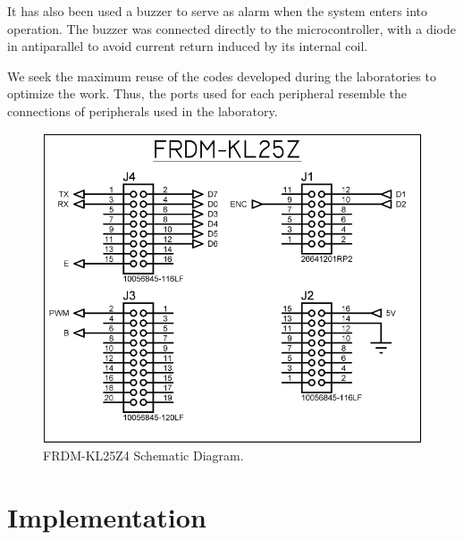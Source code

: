\documentclass[journal]{IEEEtran}
\begin{document}

It has also been used a buzzer to serve as alarm when the system enters into operation. The buzzer was connected directly to the microcontroller, with a diode in antiparallel to avoid current return induced by its internal coil.


We seek the maximum reuse of the codes developed during the laboratories to optimize the work. Thus, the ports used for each peripheral resemble the connections of peripherals used in the laboratory.

\begin{figure}[!ht]%
  \includegraphics[scale=0.48]{frdmKL25Z.png}
  \centering
  \caption{FRDM-KL25Z4 Schematic Diagram.}
\end{figure}


\section{Implementation}
\end{document}
